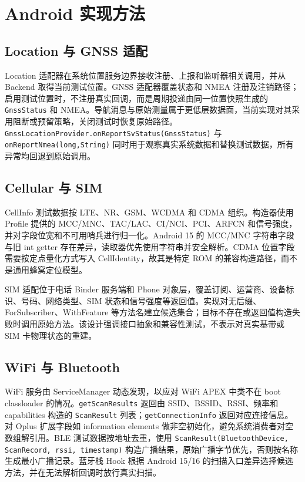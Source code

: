 \section{Android 实现方法}
\subsection{Location 与 GNSS 适配}
Location 适配器在系统位置服务边界接收注册、上报和监听器相关调用，并从 Backend 取得当前测试位置。GNSS 适配器覆盖状态和 NMEA 注册及注销路径；启用测试位置时，不注册真实回调，而是周期投递由同一位置快照生成的 \texttt{GnssStatus} 和 NMEA。导航消息与原始测量属于更低层数据面，当前实现对其采用阻断或预留策略，关闭测试时恢复原始路径。\texttt{GnssLocationProvider.onReportSvStatus(GnssStatus)} 与 \texttt{onReportNmea(long,String)} 同时用于观察真实系统数据和替换测试数据，所有异常均回退到原始调用。

\subsection{Cellular 与 SIM}
CellInfo 测试数据按 LTE、NR、GSM、WCDMA 和 CDMA 组织。构造器使用 Profile 提供的 MCC/MNC、TAC/LAC、CI/NCI、PCI、ARFCN 和信号强度，并对字段位宽和不可用哨兵进行归一化。Android 15 的 MCC/MNC 字符串字段与旧 int getter 存在差异，读取器优先使用字符串并安全解析。CDMA 位置字段需要按定点量化方式写入 CellIdentity，故其是特定 ROM 的兼容构造路径，而不是通用蜂窝定位模型。

SIM 适配位于电话 Binder 服务端和 Phone 对象层，覆盖订阅、运营商、设备标识、号码、网络类型、SIM 状态和信号强度等返回值。实现对无后缀、ForSubscriber、WithFeature 等方法名建立候选集合；目标不存在或返回值构造失败时调用原始方法。该设计强调接口抽象和兼容性测试，不表示对真实基带或 SIM 卡物理状态的重建。

\subsection{WiFi 与 Bluetooth}
WiFi 服务由 ServiceManager 动态发现，以应对 WiFi APEX 中类不在 boot classloader 的情况。\texttt{getScanResults} 返回由 SSID、BSSID、RSSI、频率和 capabilities 构造的 \texttt{ScanResult} 列表；\texttt{getConnectionInfo} 返回对应连接信息。对 Oplus 扩展字段如 information elements 做非空初始化，避免系统消费者对空数组解引用。BLE 测试数据按地址去重，使用 \texttt{ScanResult(BluetoothDevice, ScanRecord, rssi, timestamp)} 构造广播结果，原始广播字节优先，否则按名称生成最小广播记录。蓝牙栈 Hook 根据 Android 15/16 的扫描入口差异选择候选方法，并在无法解析回调时放行真实扫描。

